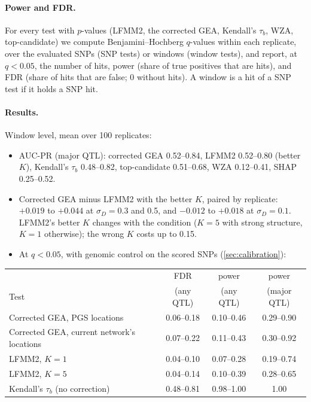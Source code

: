 \paragraph{Power and FDR.} For every test with $p$-values (LFMM2, the
corrected GEA, Kendall's $\tau_b$, WZA, top-candidate) we compute
Benjamini--Hochberg $q$-values within each replicate, over the evaluated
SNPs (SNP tests) or windows (window tests), and report, at $q < 0.05$, the
number of hits, power (share of true positives that are hits), and FDR
(share of hits that are false; 0 without hits). A window is a hit of a
SNP test if it holds a SNP hit.

\paragraph{Results.} Window level, mean over 100 replicates:
\begin{itemize}
\item AUC-PR (major QTL): corrected GEA 0.52--0.84, LFMM2 0.52--0.80
  (better $K$), Kendall's $\tau_b$ 0.48--0.82, top-candidate 0.51--0.68,
  WZA 0.12--0.41, SHAP 0.25--0.52.
\item Corrected GEA minus LFMM2 with the better $K$, paired by replicate:
  $+0.019$ to $+0.044$ at $\sigma_D = 0.3$ and 0.5, and $-0.012$ to
  $+0.018$ at $\sigma_D = 0.1$. LFMM2's better $K$ changes with the condition ($K=5$
  with strong structure, $K=1$ otherwise); the wrong $K$ costs up to 0.15.
\item At $q<0.05$, with genomic control on the scored SNPs
  (\cref{sec:calibration}):
\end{itemize}
\begin{center}
\begin{tabular}{lccc}
\toprule
 & FDR & power & power \\
Test & (any QTL) & (any QTL) & (major QTL) \\
\midrule
Corrected GEA, PGS locations & 0.06--0.18 & 0.10--0.46 & 0.29--0.90 \\
Corrected GEA, current network's locations & 0.07--0.22 & 0.11--0.43 & 0.30--0.92 \\
LFMM2, $K=1$ & 0.04--0.10 & 0.07--0.28 & 0.19--0.74 \\
LFMM2, $K=5$ & 0.04--0.14 & 0.10--0.39 & 0.28--0.65 \\
Kendall's $\tau_b$ (no correction) & 0.48--0.81 & 0.98--1.00 & 1.00 \\
\bottomrule
\end{tabular}
\end{center}
